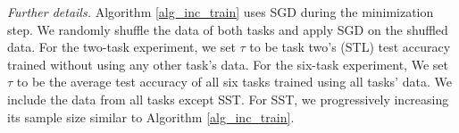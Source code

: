 \medskip
\noindent\textit{Further details.}
Algorithm \ref{alg_inc_train} uses SGD during the minimization step.
We randomly shuffle the data of both tasks and apply SGD on the shuffled data.
For the two-task experiment, we set $\tau$ to be task two's (STL) test accuracy trained without using any other task's data.
For the six-task experiment, We set $\tau$ to be the average test accuracy of all six tasks trained using all tasks' data.
We include the data from all tasks except SST. For SST, we progressively increasing its sample size similar to Algorithm \ref{alg_inc_train}.






